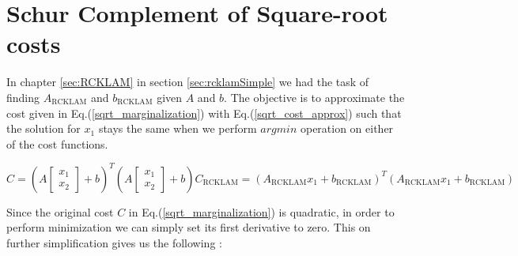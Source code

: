 \chapter{Schur Complement of Square-root costs}\label{sec:schur_sqrt_cost}

In chapter \ref{sec:RCKLAM} in section \ref{sec:rcklamSimple} we had the task of finding $A_\mathrm{RCKLAM}$ and $b_\mathrm{RCKLAM}$ given $A$ and $b$. The objective is to approximate the cost given in Eq.(\ref{sqrt_marginalization}) with Eq.(\ref{sqrt_cost_approx}) such that the solution for $x_1$ stays the same when we perform $argmin$ operation on either of the cost functions.

\begin{subequations}
  \begin{equation}
    C = \left(A\begin{bmatrix}x_1 \\ x_2\end{bmatrix} + b\right)^T\left(A\begin{bmatrix}x_1 \\ x_2\end{bmatrix} + b\right)
    \label{sqrt_marginalization}
  \end{equation}
  \begin{equation}
    C_\mathrm{RCKLAM} = \left(A_\mathrm{RCKLAM}x_1  + b_\mathrm{RCKLAM}\right)^T\left(A_\mathrm{RCKLAM}x_1  + b_\mathrm{RCKLAM}\right)
    \label{sqrt_cost_approx}
  \end{equation}
\end{subequations}

Since the original cost $C$ in Eq.(\ref{sqrt_marginalization}) is quadratic, in order to perform minimization we can simply set its first derivative to zero. This on further simplification gives us the following : 

